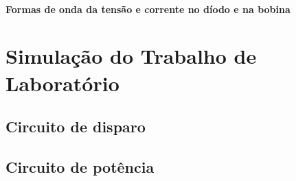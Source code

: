 \documentclass[a4paper,11pt]{article}
\numberwithin{equation}{section}
\begin{document}

\paragraph{Formas de onda da tensão e corrente no díodo e na bobina}


\section{Simulação do Trabalho de Laboratório}


\subsection{Circuito de disparo}

\subsection{Circuito de potência}
\end{document}
